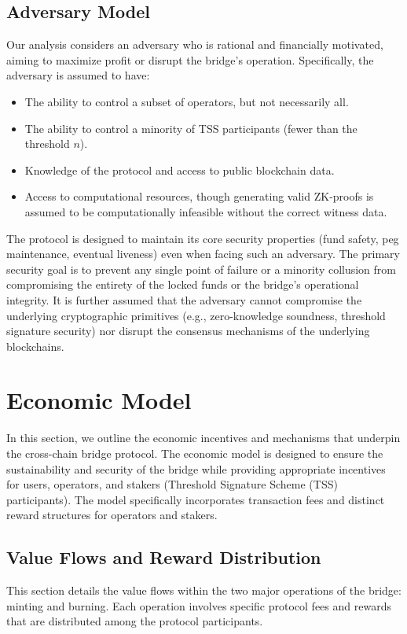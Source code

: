 \documentclass{DESSThesis}
\begin{document}
\subsection{Adversary Model}
Our analysis considers an adversary who is rational and financially motivated, aiming to maximize profit or disrupt the bridge's operation. Specifically, the adversary is assumed to have:
\begin{itemize}
\item The ability to control a subset of operators, but not necessarily all.
\item The ability to control a minority of TSS participants (fewer than the threshold $n$).
\item Knowledge of the protocol and access to public blockchain data.
\item Access to computational resources, though generating valid ZK-proofs is assumed to be computationally infeasible without the correct witness data.
\end{itemize}
The protocol is designed to maintain its core security properties (fund safety, peg maintenance, eventual liveness) even when facing such an adversary. The primary security goal is to prevent any single point of failure or a minority collusion from compromising the entirety of the locked funds or the bridge's operational integrity.
It is further assumed that the adversary cannot compromise the underlying cryptographic primitives (e.g., zero-knowledge soundness, threshold signature security) nor disrupt the consensus mechanisms of the underlying blockchains.





\section{Economic Model} \label{sec:economic-model}
In this section, we outline the economic incentives and mechanisms that underpin the cross-chain bridge protocol. The economic model is designed to ensure the sustainability and security of the bridge while providing appropriate incentives for users, operators, and stakers (Threshold Signature Scheme (TSS) participants). The model specifically incorporates transaction fees and distinct reward structures for operators and stakers.

\subsection{Value Flows and Reward Distribution}
\label{subsec:value_flow_and_rewward_distribution}
This section details the value flows within the two major operations of the bridge: minting and burning. Each operation involves specific protocol fees and rewards that are distributed among the protocol participants.
\end{document}
